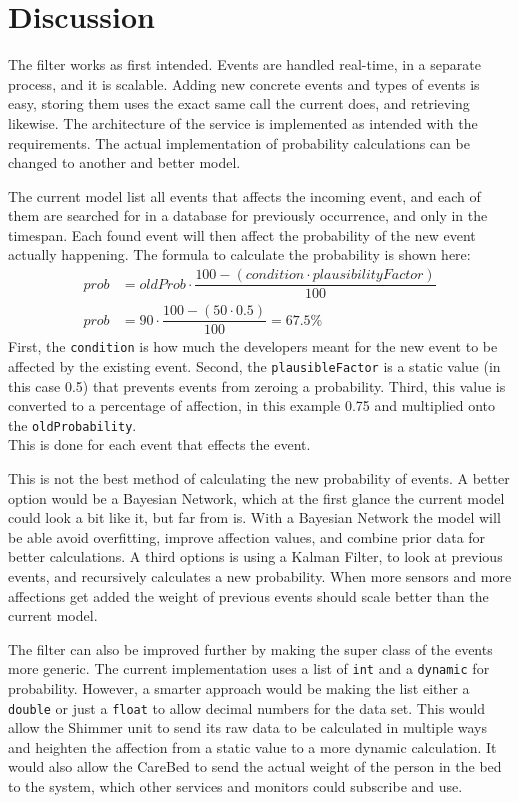 \section{Discussion}

The filter works as first intended.
Events are handled real-time, in a separate process, and it is scalable.
Adding new concrete events and types of events is easy, storing them uses the exact same call the current does, and retrieving likewise.
The architecture of the service is implemented as intended with the requirements.
The actual implementation of probability calculations can be changed to another and better model.

The current model list all events that affects the incoming event, and each of them are searched for in a database for previously occurrence, and only in the timespan.
Each found event will then affect the probability of the new event actually happening.
The formula to calculate the probability is shown here:
\begin{align*}
prob &= oldProb \cdot \dfrac{100 - (condition \cdot plausibilityFactor)}{100} \\
prob &= 90 \cdot \dfrac{100 - (50 \cdot 0.5)}{100} = 67.5\%
\end{align*}
First, the \texttt{condition} is how much the developers meant for the new event to be affected by the existing event.
Second, the \texttt{plausibleFactor} is a static value (in this case 0.5) that prevents events from zeroing a probability.
Third, this value is converted to a percentage of affection, in this example 0.75 and multiplied onto the \texttt{oldProbability}.
\\
This is done for each event that effects the event.

This is not the best method of calculating the new probability of events.
A better option would be a Bayesian Network\cite{MicrosoftBayesian}, which at the first glance the current model could look a bit like it, but far from is.
With a Bayesian Network the model will be able avoid overfitting, improve affection values, and combine prior data for better calculations.
A third options is using a Kalman Filter\cite{welch2006introduction}, to look at previous events, and recursively calculates a new probability.
When more sensors and more affections get added the weight of previous events should scale better than the current model.

The filter can also be improved further by making the super class of the events more generic.
The current implementation uses a list of \texttt{int} and a \texttt{dynamic} for probability.
However, a smarter approach would be making the list either a \texttt{double} or just a \texttt{float} to allow decimal numbers for the data set.
This would allow the Shimmer unit to send its raw data to be calculated in multiple ways and heighten the affection from a static value to a more dynamic calculation.
It would also allow the CareBed to send the actual weight of the person in the bed to the system, which other services and monitors could subscribe and use.

